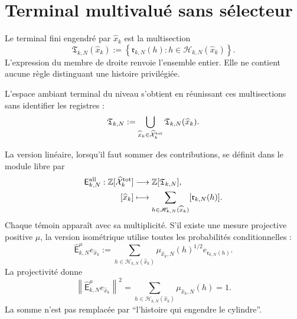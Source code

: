 \section{Terminal multivalué sans sélecteur}

Le terminal fini engendré par \(\widehat x_k\) est la multisection
\begin{equation}
\label{eq:pdfv2-terminal-multivaluado}
 \mathfrak T_{k,N}(\widehat x_k)
 :=\left\{\mathfrak r_{k,N}(h):
            h\in\mathscr H_{k,N}(\widehat x_k)\right\}.
\end{equation}
L'expression du membre de droite renvoie l'ensemble entier. Elle ne contient aucune règle distinguant une histoire privilégiée.

L'espace ambiant terminal du niveau s'obtient en réunissant ces multisections sans identifier les registres :
\begin{equation}
\label{eq:pdfv2-terminal-ambiente-nivel}
 \mathfrak T_{k,N}
 :=\bigcup_{\widehat x_k\in\widehat{\mathcal X}^{\rm tot}_k}
   \mathfrak T_{k,N}(\widehat x_k).
\end{equation}

La version linéaire, lorsqu'il faut sommer des contributions, se définit dans le module libre par
\begin{equation}
\label{eq:pdfv2-terminal-evaluacion-todas}
 \begin{aligned}
 \mathsf E_{k,N}^{\rm all}:
 \mathbb Z[\widehat{\mathcal X}^{\rm tot}_k]&\longrightarrow
 \mathbb Z[\mathfrak T_{k,N}],\\
 [\widehat x_k]&\longmapsto
 \sum_{h\in\mathscr H_{k,N}(\widehat x_k)}
 [\mathfrak r_{k,N}(h)].
 \end{aligned}
\end{equation}
Chaque témoin apparaît avec sa multiplicité. S'il existe une mesure projective positive \(\mu\), la version isométrique utilise toutes les probabilités conditionnelles :
\begin{equation}
\label{eq:pdfv2-terminal-evaluacion-ponderada}
 \widehat{\mathsf E}_{k,N}^{\mu}e_{\widehat x_k}
 :=\sum_{h\in\mathscr H_{k,N}(\widehat x_k)}
 \mu_{\widehat x_k,N}(h)^{1/2}
 e_{\mathfrak r_{k,N}(h)}.
\end{equation}
La projectivité donne
\begin{equation}
\label{eq:pdfv2-terminal-isometria}
 \left\|\widehat{\mathsf E}_{k,N}^{\mu}e_{\widehat x_k}\right\|^2
 =\sum_{h\in\mathscr H_{k,N}(\widehat x_k)}
   \mu_{\widehat x_k,N}(h)=1.
\end{equation}
La somme n'est pas remplacée par ``l'histoire qui engendre le cylindre''.

